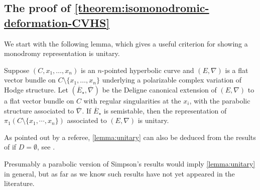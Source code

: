 \subsection{The proof of \autoref{theorem:isomonodromic-deformation-CVHS}}
\label{subsection:iso-def-proof}
We start with the following lemma, which gives a useful criterion for showing a
monodromy representation is unitary.
\begin{lemma}
\notready
	\label{lemma:unitary}
	Suppose $(C, x_1, \ldots, x_n)$ is an $n$-pointed hyperbolic curve and $(E,
	\nabla)$ is a flat vector bundle on $C\setminus\{ x_1, \ldots, x_n\}$
	underlying a polarizable complex variation of Hodge structure. Let
	$(\overline{E}_\star, \overline{\nabla})$ be the Deligne canonical extension of $(E, \nabla)$ to a flat vector bundle on $C$ with regular singularities at the $x_i$, with the parabolic structure associated to $\overline{\nabla}$.
	If $\overline{E}_\star$ is semistable, then the representation of $\pi_1(C\setminus\{x_1, \cdots, x_n\})$
	associated to $(E, \nabla)$ is unitary.
\end{lemma}
\begin{remark}
\notready
	\label{remark:simpson-reference}
	As pointed out by a referee, \autoref{lemma:unitary} can also be deduced from the results of
	\cite{simpson:iterated-destabilizing-modifications} if $D=\emptyset$, see \cite[\S5.4]{simpson:iterated-destabilizing-modifications}.

	Presumably a parabolic version of Simpson's results would imply  \autoref{lemma:unitary} in general, but as far as we know such results have not yet appeared in the literature.
\end{remark}

